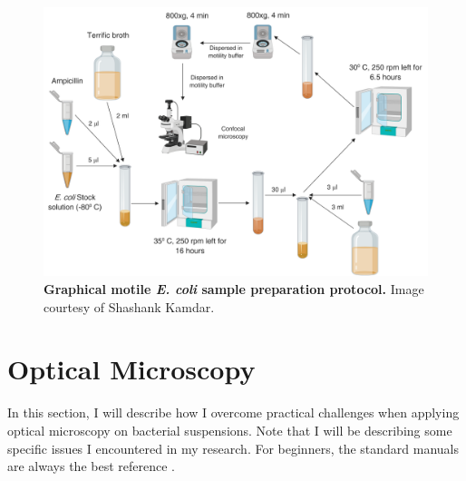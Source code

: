 \begin{figure}[ht]
	\begin{center}
	\includegraphics[width=5.5 in]{Figs/2-Exp/2.pdf}
	\end{center}
	\caption[Graphical Motile \textit{E. coli} Sample Preparation Protocol]
	{
	\textbf{Graphical motile \textit{E. coli} sample preparation protocol.}
	Image courtesy of Shashank Kamdar.
	}
	\label{fig:2-2}
\end{figure}





\section{Optical Microscopy}
\label{sec:optical-microscopy}

In this section, I will describe how I overcome practical challenges when applying optical microscopy on bacterial suspensions. Note that I will be describing some specific issues I encountered in my research. For beginners, the standard manuals are always the best reference \cite{NikonTiEManual}.

